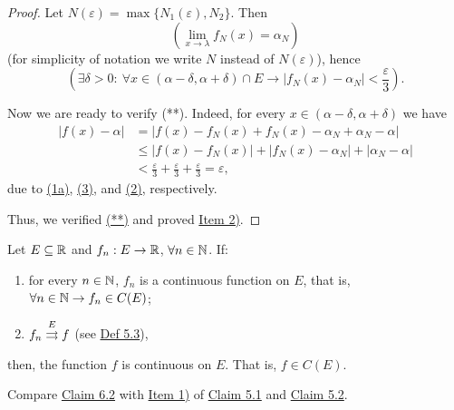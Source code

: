 \begin{proof}
Let $N(\varepsilon)=\max\{N_1(\varepsilon),N_2\}$. Then
\[
\left(\lim_{x\to\lambda}f_N(x)=\alpha_N\right)
\]
(for simplicity of notation we write $N$ instead of $N(\varepsilon)$), hence
\[
\left(\exists\delta>0:\ \forall x\in(\alpha-\delta,\alpha+\delta)\cap E
\to |f_N(x)-\alpha_N|<\frac{\varepsilon}{3}\right).
\tag{3}\label{eq:6:3:1}
\]

Now we are ready to verify (**). Indeed, for every $x\in(\alpha-\delta,\alpha+\delta)$ we have
\begin{align*}
|f(x)-\alpha|
&=|f(x)-f_N(x)+f_N(x)-\alpha_N+\alpha_N-\alpha|\\
&\leq |f(x)-f_N(x)|+|f_N(x)-\alpha_N|+|\alpha_N-\alpha|\\
&<\frac{\varepsilon}{3}+\frac{\varepsilon}{3}+\frac{\varepsilon}{3}=\varepsilon,
\end{align*}
due to \hyperref[eq:6:1a:1]{(1a)}, \hyperref[eq:6:3:1]{(3)}, and \hyperref[eq:6:2:1]{(2)}, respectively.

Thus, we verified \hyperref[eq:6:starstar:1]{(**)} and proved \hyperref[item:claim:6.1:2]{Item 2)}.
\end{proof}

\begin{claim}\label{claim:6.2}
Let $E\subseteq\mathbb{R}$ and $f_n:E\to\mathbb{R}$, $\forall n\in\mathbb{N}$.
If:
\begin{enumerate}[label=\alph*)]
    \item\label{item:claim:6.2:a} for every $n\in\mathbb{N}$, $f_n$ is a continuous function on $E$, that is, $\forall n\in\mathbb{N}\to f_n\in C(E)$;
    \item\label{item:claim:6.2:b} $f_n\mathrel{\overset{E}{\rightrightarrows}}f$ \quad (see \hyperref[def:5.3]{Def 5.3}),
\end{enumerate}
then, the function $f$ is continuous on $E$. That is, $f\in C(E)$.
\end{claim}

Compare \hyperref[claim:6.2]{Claim 6.2} with \hyperref[item:claim:5.1:1]{Item 1)} of \hyperref[claim:5.1]{Claim 5.1} and \hyperref[claim:5.2]{Claim 5.2}.


